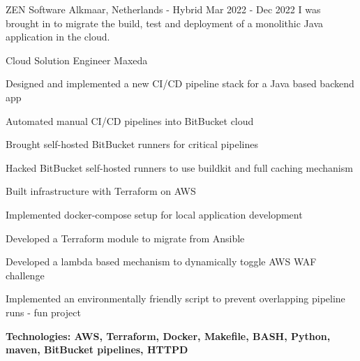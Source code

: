 \begin{cventries}
{ZEN Software}
{Alkmaar, Netherlands - Hybrid}
{Mar 2022 - Dec 2022}
{I was brought in to migrate the build, test and deployment of a monolithic Java application in the cloud.}
\hfill\begin{minipage}{\dimexpr\textwidth-1cm}
\xdef\tpd{\the\prevdepth}
\begin{cventrystack}
	\cventry
	{Cloud Solution Engineer} %
	{Maxeda} %
	{}
	{}
	{
		\begin{cvitems}
			\item {Designed and implemented a new CI/CD pipeline stack for a Java based backend app}
			\item {Automated manual CI/CD pipelines into BitBucket cloud}
			\item {Brought self-hosted BitBucket runners for critical pipelines}
			\item {Hacked BitBucket self-hosted runners to use buildkit and full caching mechanism}
			\item {Built infrastructure with Terraform on AWS}
			\item {Implemented docker-compose setup for local application development}
			\item {Developed a Terraform module to migrate from Ansible}
			\item {Developed a lambda based mechanism to dynamically toggle AWS WAF challenge}
			\item {Implemented an environmentally friendly script to prevent overlapping pipeline runs - fun project}
			\item {\bfseries{Technologies:} AWS, Terraform, Docker, Makefile, BASH, Python, maven, BitBucket pipelines, HTTPD}
		\end{cvitems}
	}
\end{cventrystack}
\end{minipage}


\end{cventries}
